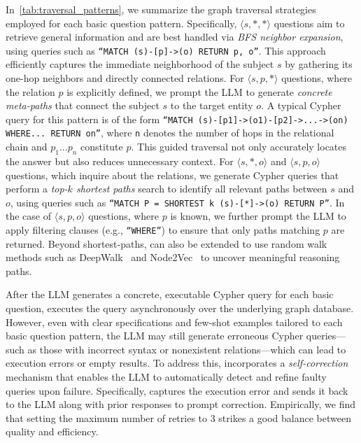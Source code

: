 In~\autoref{tab:traversal_patterns}, we summarize the graph traversal strategies employed for each basic question pattern. Specifically, $\langle s,*,* \rangle$ questions aim to retrieve general information and are best handled via \textit{BFS neighbor expansion}, using queries such as \texttt{``MATCH (s)-[p]->(o) RETURN p, o''}. This approach efficiently captures the immediate neighborhood of the subject $s$ by gathering its one-hop neighbors and directly connected relations. For $\langle s,p,* \rangle$ questions, where the relation $p$ is explicitly defined, we prompt the LLM to generate \textit{concrete meta-paths} that connect the subject $s$ to the target entity $o$. A typical Cypher query for this pattern is of the form \texttt{``MATCH (s)-[p1]->(o1)-[p2]->...->(on) WHERE... RETURN on''}, where \texttt{n} denotes the number of hops in the relational chain and $p_1...p_n$ constitute $p$. This guided traversal not only accurately locates the answer but also reduces unnecessary context. For $\langle s,*,o \rangle$ and $\langle s,p,o \rangle$ questions, which inquire about the relations, we generate Cypher queries that perform a \textit{top-$k$ shortest paths} search to identify all relevant paths between $s$ and $o$, using queries such as \texttt{``MATCH P = SHORTEST k (s)-[*]->(o) RETURN P''}. In the case of $\langle s,p,o \rangle$ questions, where $p$ is known, we further prompt the LLM to apply filtering clauses (e.g., \texttt{``WHERE''}) to ensure that only paths matching $p$ are returned. Beyond shortest-paths, \name{} can also be extended to use random walk methods such as DeepWalk~\cite{deepwalk} and Node2Vec~\cite{node2vec} to uncover meaningful reasoning paths.


 After the LLM generates a concrete, executable Cypher query for each basic question, \name{} executes the query asynchronously over the underlying graph database. However, even with clear specifications and few-shot examples tailored to each basic question pattern, the LLM may still generate erroneous Cypher queries—such as those with incorrect syntax or nonexistent relations—which can lead to execution errors or empty results. To address this, \name{} incorporates a \textit{self-correction} mechanism that enables the LLM to automatically detect and refine faulty queries upon failure. Specifically, \name{} captures the execution error and sends it back to the LLM along with prior responses to prompt correction. Empirically, we find that setting the maximum number of retries to 3 strikes a good balance between quality and efficiency.


